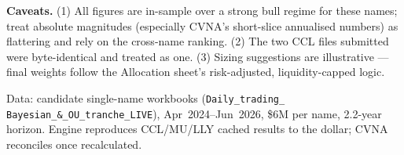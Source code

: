 \documentclass[11pt]{article}
\begin{document}
\textbf{Caveats.} (1) All figures are in-sample over a strong bull regime for these names; treat
absolute magnitudes (especially CVNA's short-slice annualised numbers) as flattering and rely on
the cross-name ranking. (2) The two CCL files submitted were byte-identical and treated as one.
(3) Sizing suggestions are illustrative --- final weights follow the Allocation sheet's
risk-adjusted, liquidity-capped logic.

\vfill
{\footnotesize\color{bcgrey} Data: candidate single-name workbooks (\texttt{Daily\_trading\_
Bayesian\_\&\_OU\_tranche\_LIVE}), Apr~2024--Jun~2026, \$6M per name, 2.2-year horizon. Engine
reproduces CCL/MU/LLY cached results to the dollar; CVNA reconciles once recalculated.}
\end{document}
